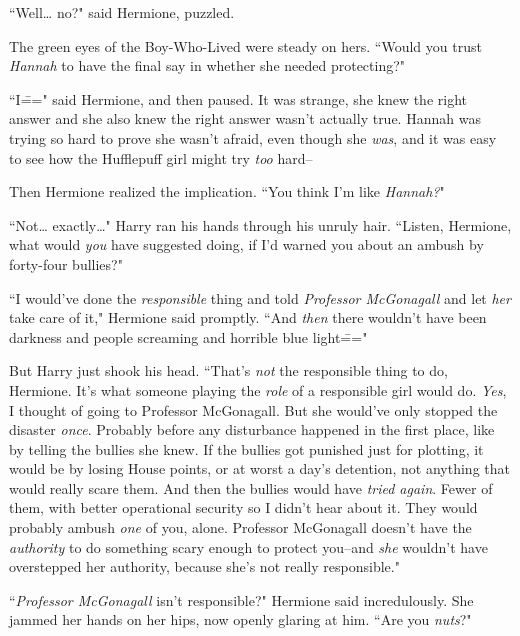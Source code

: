 ``Well{\ldots} no?" said Hermione, puzzled.

The green eyes of the Boy-Who-Lived were steady on hers. ``Would you trust \emph{Hannah} to have the final say in whether she needed protecting?"

``I\===" said Hermione, and then paused. It was strange, she knew the right answer and she also knew the right answer wasn't actually true. Hannah was trying so hard to prove she wasn't afraid, even though she \emph{was}, and it was easy to see how the Hufflepuff girl might try \emph{too} hard\---

Then Hermione realized the implication. ``You think I'm like \emph{Hannah?}"

``Not{\ldots} exactly{\ldots}" Harry ran his hands through his unruly hair. ``Listen, Hermione, what would \emph{you} have suggested doing, if I'd warned you about an ambush by forty-four bullies?"

``I would've done the \emph{responsible} thing and told \emph{Professor McGonagall} and let \emph{her} take care of it," Hermione said promptly. ``And \emph{then} there wouldn't have been darkness and people screaming and horrible blue light\==="

But Harry just shook his head. ``That's \emph{not} the responsible thing to do, Hermione. It's what someone playing the \emph{role} of a responsible girl would do. \emph{Yes}, I thought of going to Professor McGonagall. But she would've only stopped the disaster \emph{once}. Probably before any disturbance happened in the first place, like by telling the bullies she knew. If the bullies got punished just for plotting, it would be by losing House points, or at worst a day's detention, not anything that would really scare them. And then the bullies would have \emph{tried again}. Fewer of them, with better operational security so I didn't hear about it. They would probably ambush \emph{one} of you, alone. Professor McGonagall doesn't have the \emph{authority} to do something scary enough to protect you\---and \emph{she} wouldn't have overstepped her authority, because she's not really responsible."

``\emph{Professor McGonagall} isn't responsible?" Hermione said incredulously. She jammed her hands on her hips, now openly glaring at him. ``Are you \emph{nuts}?"

